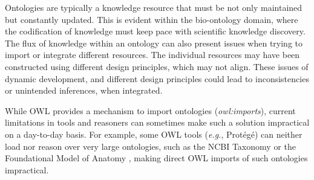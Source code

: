 \documentclass[a4paper,10pt,twocolumn]{article}
\newcommand{\protege}{Prot\'{e}g\'{e}}
\begin{document}


Ontologies are typically a knowledge resource that must be not only maintained but constantly updated.
This is evident within the bio-ontology domain, where the codification of knowledge must keep pace with scientific knowledge discovery.
The flux of knowledge within an ontology can also present issues when trying to import or integrate different resources.
The individual resources may have been constructed using different design principles, which may not align.
These issues of dynamic development, and different design principles could lead to inconsistencies or unintended inferences, when integrated.


While \ac{OWL} \cite{RefWorks:1506} provides a mechanism to import ontologies (\emph{owl:imports}), current limitations in tools and reasoners can sometimes make such a solution impractical on a day-to-day basis.
For example, some OWL tools (\emph{e.g.}, Prot\'eg\'e) can neither load nor reason over very large ontologies, such as the NCBI Taxonomy \cite{RefWorks:1502} or the Foundational Model of Anatomy \cite{RefWorks:1558}, making direct \ac{OWL} imports of such ontologies impractical. 


\end{document}
